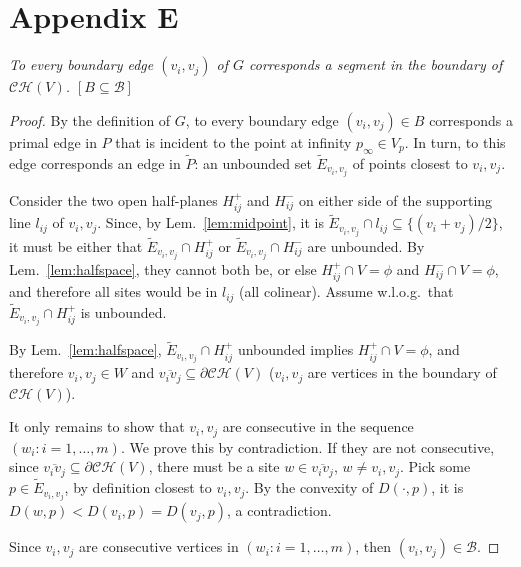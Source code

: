\documentclass[11pt]{article}
\begin{document}
\section*{Appendix E}\label{app:boundary}




\emph{	To every boundary edge $(v_i,v_j)$ of $G$ corresponds a segment in the boundary of $\mathcal{CH}(V)$.  \emph{$[B\subseteq\mathcal{B}]$}
}
\begin{proof}
By the definition of $G$, 
to every boundary edge $(v_i,v_j)\in B$ corresponds a primal edge in $P$
that is incident to the point at infinity $p_\infty\in V_p$. 
In turn, to this edge corresponds an edge in $\tilde{P}$: 
an unbounded set $\tilde{E}_{v_i,v_j}$ of points closest to $v_i,v_j$.


Consider the two open half-planes $H^{+}_{ij}$ and $H^{-}_{ij}$ on either
side of the supporting line $l_{ij}$ of $v_i,v_j$. 
Since, by Lem.~\ref{lem:midpoint}, it is $\tilde{E}_{v_i,v_j}\cap l_{ij} \subseteq
\{(v_i+v_j)/2\}$, it must be either that $\tilde{E}_{v_i,v_j}\cap H^{+}_{ij}$ or
$\tilde{E}_{v_i,v_j}\cap H^{-}_{ij}$ are unbounded. 
By Lem.~\ref{lem:halfspace}, they cannot both be, or else 
$H^{+}_{ij}\cap V=\phi$ and $H^{-}_{ij}\cap V=\phi$, and therefore all sites
would be in $l_{ij}$ (all colinear). 
Assume w.l.o.g.\  that $\tilde{E}_{v_i,v_j}\cap H^{+}_{ij}$ is unbounded. 

By Lem.~\ref{lem:halfspace}, $\tilde{E}_{v_i,v_j}\cap H^{+}_{ij}$ unbounded implies 
$H^{+}_{ij}\cap V=\phi$, and therefore
$v_i,v_j\in W$ and $\overline{v_i v_j}\subseteq\partial\mathcal{CH}(V)$  
($v_i,v_j$ are vertices in the boundary of $\mathcal{CH}(V)$). 

It only remains to show that $v_i,v_j$ are consecutive in the sequence $(w_i :
i=1,\dots,m)$. 
We prove this by contradiction. 
If they are not consecutive, since $\overline{v_i
v_j}\subseteq\partial\mathcal{CH}(V)$, 
there must be a site $w\in \overline{v_i v_j}$, $w\neq v_i,v_j$. 
Pick some
$p\in \tilde{E}_{v_i,v_j}$, by definition closest to $v_i,v_j$. 
By the convexity of $D(\cdot,p)$, it is $D(w,p) < D(v_i,p)=D(v_j,p)$, a contradiction. 

Since $v_i,v_j$ are consecutive vertices in $(w_i : i=1,\dots,m)$, then 
$(v_i,v_j)\in\mathcal{B}$. 
\end{proof}
\end{document}
